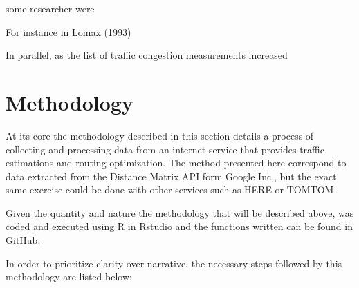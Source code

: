 \documentclass[a4paper]{jpconf}
\begin{document}
some researcher were 

For instance in Lomax (1993) 

In parallel, as the list of traffic congestion measurements increased 










\section{Methodology} %
\indent At its core the methodology described in this section details a process of collecting and processing data from an internet service that provides traffic estimations and routing optimization. The method presented here correspond to data extracted from the Distance Matrix API form Google Inc., but the exact same exercise could be done with other services such as HERE or TOMTOM.\par
\indent Given the quantity and nature the methodology that will be described above, was coded and executed using R in Rstudio and the functions written can be found in GitHub. \par
\indent In order to prioritize clarity over narrative, the necessary steps followed by this methodology are listed below: 
\end{document}

